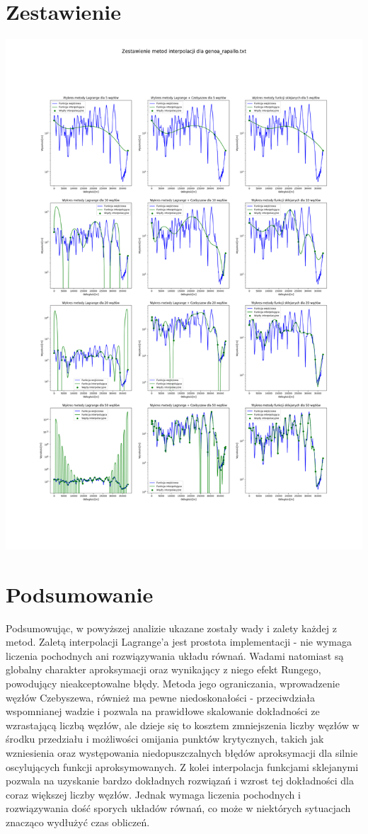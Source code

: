 \documentclass[a4paper,12pt]{article}
\begin{document}
\section{Zestawienie}
    \begin{center}
        \includegraphics[scale=0.3]{../charts/comparison_genoa_rapallo.png}
    \end{center}
    
\section{Podsumowanie}
	Podsumowując, w powyższej analizie ukazane zostały wady i zalety każdej z metod. Zaletą interpolacji Lagrange'a jest prostota implementacji - nie wymaga liczenia pochodnych ani rozwiązywania układu równań. Wadami natomiast są globalny charakter aproksymacji oraz wynikający z niego efekt Rungego, powodujący nieakceptowalne błędy. Metoda jego ograniczania, wprowadzenie węzłów Czebyszewa, również ma pewne niedoskonałości - przeciwdziała wspomnianej wadzie i pozwala na prawidłowe skalowanie dokładności ze wzrastającą liczbą węzłów, ale dzieje się to kosztem zmniejszenia liczby węzłów w środku przedziału i możliwości omijania punktów krytycznych, takich jak wzniesienia oraz występowania niedopuszczalnych błędów aproksymacji dla silnie oscylujących funkcji aproksymowanych. Z kolei interpolacja funkcjami sklejanymi pozwala na uzyskanie bardzo dokładnych rozwiązań i wzrost tej dokładności dla coraz większej liczby węzłów. Jednak wymaga liczenia pochodnych i rozwiązywania dość sporych układów równań, co może w niektórych sytuacjach znacząco wydłużyć czas obliczeń.
\end{document}
